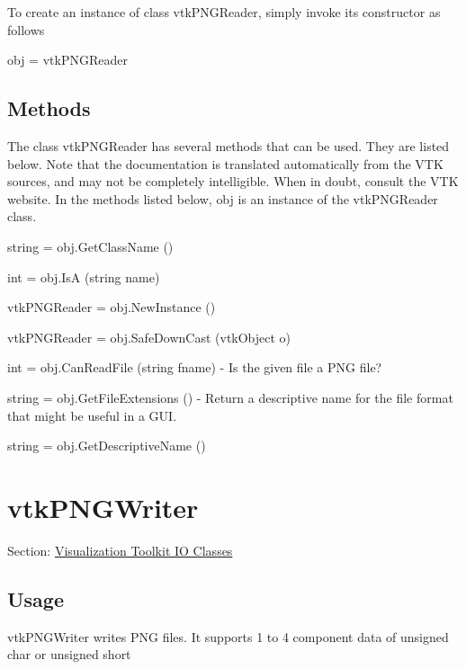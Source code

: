 To create an instance of class vtk\-P\-N\-G\-Reader, simply invoke its constructor as follows \begin{DoxyVerb}  obj = vtkPNGReader
\end{DoxyVerb}
 \hypertarget{vtkwidgets_vtkxyplotwidget_Methods}{}\subsection{Methods}\label{vtkwidgets_vtkxyplotwidget_Methods}
The class vtk\-P\-N\-G\-Reader has several methods that can be used. They are listed below. Note that the documentation is translated automatically from the V\-T\-K sources, and may not be completely intelligible. When in doubt, consult the V\-T\-K website. In the methods listed below, {\ttfamily obj} is an instance of the vtk\-P\-N\-G\-Reader class. 
\begin{DoxyItemize}
\item {\ttfamily string = obj.\-Get\-Class\-Name ()}  
\item {\ttfamily int = obj.\-Is\-A (string name)}  
\item {\ttfamily vtk\-P\-N\-G\-Reader = obj.\-New\-Instance ()}  
\item {\ttfamily vtk\-P\-N\-G\-Reader = obj.\-Safe\-Down\-Cast (vtk\-Object o)}  
\item {\ttfamily int = obj.\-Can\-Read\-File (string fname)} -\/ Is the given file a P\-N\-G file?  
\item {\ttfamily string = obj.\-Get\-File\-Extensions ()} -\/ Return a descriptive name for the file format that might be useful in a G\-U\-I.  
\item {\ttfamily string = obj.\-Get\-Descriptive\-Name ()}  
\end{DoxyItemize}\hypertarget{vtkio_vtkpngwriter}{}\section{vtk\-P\-N\-G\-Writer}\label{vtkio_vtkpngwriter}
Section\-: \hyperlink{sec_vtkio}{Visualization Toolkit I\-O Classes} \hypertarget{vtkwidgets_vtkxyplotwidget_Usage}{}\subsection{Usage}\label{vtkwidgets_vtkxyplotwidget_Usage}
vtk\-P\-N\-G\-Writer writes P\-N\-G files. It supports 1 to 4 component data of unsigned char or unsigned short

